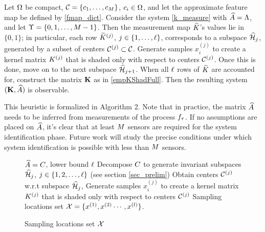 \begin{remark}\label{rem:1}
 Let $\Omega$ be compact, $\mathcal{C} = \{c_1,\dots,c_{M}\}$, $c_i\in\Omega$, and let the approximate feature map be defined by \eqref{fmap_dict}. Consider the system \eqref{k_measure} with $\widehat{A}=\Lambda$, and let $\Upsilon = \{0,1,\dots,M-1\}$. Then the measurement map $\widetilde{K}$'s values lie in $\{0, 1\}$; in particular, each row $\widetilde{K}^{(j)}$, $j\in\{1,\dots,\ell\}$, corresponds to a subspace $\widehat{\mathcal{H}}_{j}$, generated by a subset of centers $\mathcal{C}^{(j)}\subset\mathcal{C}$. Generate samples $x_i^{(j)}$ to create a kernel matrix $K^{(j)}$ that is shaded only with respect to centers $\mathcal{C}^{(j)}$. Once this is done, move on to the next subspace $\widehat{\mathcal{H}}_{j+1}$. When all $\ell$ rows of $\widetilde{K}$ are accounted for, construct the matrix $\mathbf{K}$ as in \eqref{empKShadFull}. Then the resulting system $(\mathbf{K}, \widehat{A})$ is observable. 
\end{remark}


This heuristic is formalized in Algorithm 2. Note that in practice, the matrix $\widehat{A}$ needs to be inferred from measurements of the process $f_{\tau}$. If no assumptions are placed on $\widehat{A}$, it's clear that at least $M$ sensors are required for the system identification phase. Future work will study the precise conditions under which system identification is possible with less than $M$ sensors. 
\begin{figure}[t!]
	\begin{algorithm}[H]
		\caption{Sampling locations set $ \mathcal{X} $}
		\label{alg:samples}
		\begin{algorithmic}
				 $ \widehat{A} =C $, lower bound $\ell$
				\STATE Decompose $ C $ to generate invariant subspaces $ \widehat{\mathcal{H}}_{j} $, $ j\in \{1,2,\dots,\ell\} $ (see section \ref{sec_prelim})
				\STATE Obtain centers $\mathcal{C}^{(j)}$ w.r.t subspace $ \widehat{\mathcal{H}}_{j} $,
				\STATE Generate samples $x_i^{(j)}$ to create a kernel matrix $K^{(j)}$ that is shaded only with respect to centers $\mathcal{C}^{(j)}$
				\ENDFOR
				 Sampling locations set  $\mathcal{X} =\{x^{(1)}, x^{(2)}\cdots,x^{(l)}\} $.
		\end{algorithmic}
	\end{algorithm}
\end{figure}

